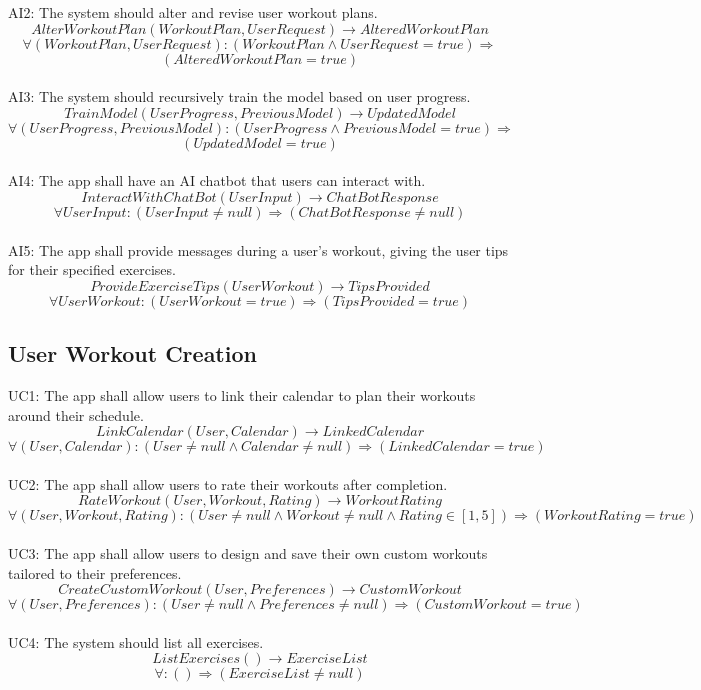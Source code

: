 \documentclass[12pt]{article}
\begin{document}
AI2: The system should alter and revise user workout plans.
\[AlterWorkoutPlan(WorkoutPlan, UserRequest) \rightarrow AlteredWorkoutPlan \]
\[ \forall (WorkoutPlan, UserRequest): (WorkoutPlan \land UserRequest = true) \Rightarrow\] \[(AlteredWorkoutPlan = true) \]\\

AI3: The system should recursively train the model based on user progress.
\[TrainModel(UserProgress, PreviousModel) \rightarrow UpdatedModel \]
\[ \forall (UserProgress, PreviousModel): (UserProgress \land PreviousModel = true) \Rightarrow\] \[(UpdatedModel = true) \]\\

AI4: The app shall have an AI chatbot that users can interact with.
\[InteractWithChatBot(UserInput) \rightarrow ChatBotResponse \]
\[ \forall UserInput: (UserInput \neq null) \Rightarrow (ChatBotResponse \neq null) \]\\

AI5: The app shall provide messages during a user's workout, giving the user tips for their specified exercises.
\[ProvideExerciseTips(UserWorkout) \rightarrow TipsProvided \]
\[ \forall UserWorkout: (UserWorkout = true) \Rightarrow (TipsProvided = true) \]

\subsection{User Workout Creation}
UC1: The app shall allow users to link their calendar to plan their workouts around their schedule.
\[LinkCalendar(User, Calendar) \rightarrow LinkedCalendar \]
\[ \forall (User, Calendar): (User \neq null \land Calendar \neq null) \Rightarrow (LinkedCalendar = true) \]
\\

UC2: The app shall allow users to rate their workouts after completion.
\[RateWorkout(User, Workout, Rating) \rightarrow WorkoutRating \]
\[ \forall (User, Workout, Rating):(User \neq null \land Workout \neq null \land Rating \in [1,5]) \Rightarrow (WorkoutRating = true) \]\\

UC3: The app shall allow users to design and save their own custom workouts tailored to their preferences.
\[CreateCustomWorkout(User, Preferences) \rightarrow CustomWorkout \]
\[ \forall (User, Preferences):(User \neq null \land Preferences \neq null) \Rightarrow (CustomWorkout = true) \]\\

UC4: The system should list all exercises.
\[ListExercises() \rightarrow ExerciseList \]
\[ \forall : () \Rightarrow (ExerciseList \neq null) \]
\end{document}
